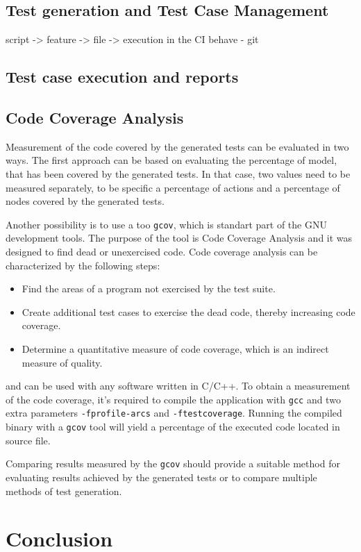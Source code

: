 \section{Test generation and Test Case Management}
script -> feature -> file -> execution in the CI
behave - git
\section{}

\section{Test case execution and reports}
\section{Code Coverage Analysis}
Measurement of the code covered by the generated tests can be evaluated in two ways. 
The first approach can be based on evaluating the percentage of model, that has been covered by the generated tests. In that case, two values need to be measured separately, to be specific a percentage of actions and a percentage of nodes covered by the generated tests.

Another possibility is to use a too \verb|gcov|, which is standart part of the GNU development tools. The purpose of the tool is Code Coverage Analysis and it was designed to find dead or unexercised code. Code coverage analysis can be characterized by the following steps: 
\begin{itemize}
  \item Find the areas of a program not exercised by the test suite.
  \item Create additional test cases to exercise the dead code, thereby increasing code coverage.
  \item Determine a quantitative measure of code coverage, which is an indirect measure of quality.
\end{itemize}

and can be used with any software written in C/C++. To obtain a measurement of the code coverage, it's required to compile the application with \verb|gcc| and two extra parameters \verb|-fprofile-arcs| and \verb|-ftestcoverage|. Running the compiled binary with a \verb|gcov| tool will yield a percentage of the executed code located in source file.\cite{gcov}

Comparing results measured by the \verb|gcov| should provide a suitable method for evaluating results achieved by the generated tests or to compare multiple methods of test generation.  



\chapter{Conclusion}